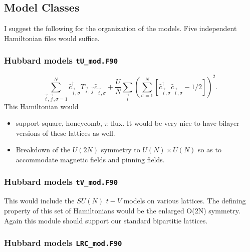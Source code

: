 

\subsection{  Model Classes }

I suggest the following for the organization of the models.    Five independent Hamiltonian   files would suffice.


\subsubsection{Hubbard models   \texttt{tU\_mod.F90}}

\begin{equation}
    \sum_{\vec{i},\vec{j},\sigma=1}^{N}  \hat{c}^{\dagger}_{\vec{i},\sigma } T_{\vec{i},\vec{j}} \hat{c}^{\phantom\dagger}_{\vec{i},\sigma }     +  \frac{U}{N} \sum_{\vec{i}} \left(\sum_{\sigma=1}^{N}  \left[   \hat{c}^{\dagger}_{\vec{i},\sigma } 
    \hat{c}^{\phantom\dagger}_{\vec{i},\sigma }  - 1/2  \right] \right)^2 .
\end{equation}
This Hamiltonian would
\begin{itemize} 
\item support   square,  honeycomb,  $\pi$-flux.  It would be very nice to have bilayer versions of these lattices as well. 
\item Breakdown of the $U(2N)$ symmetry to $U(N) \times U(N)$ so as to accommodate magnetic fields and pinning fields.  
\end{itemize}


\subsubsection{Hubbard models   \texttt{tV\_mod.F90}}

This would include the $SU(N)$  $t-V$ models on various lattices.  The defining property of this set of Hamiltonians would be the enlarged O(2N) symmetry.  Again  this   module should support our standard bipartitie lattices. 


\subsubsection{Hubbard models   \texttt{LRC\_mod.F90}}

